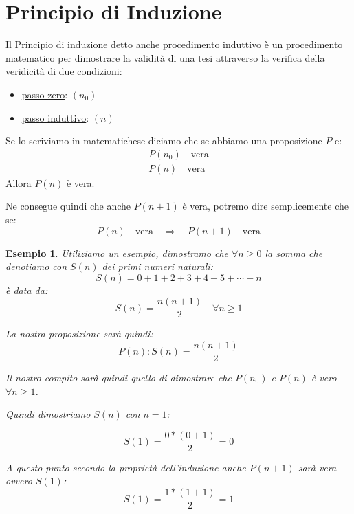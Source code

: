 \documentclass{article}
\newtheorem{exmp}{Esempio}[section]
\theoremstyle{definition}
\begin{document}
\newpage
\section{Principio di Induzione}\label{sec:principio_di_induzione}
Il \underline{Principio di induzione} detto anche procedimento induttivo è un procedimento matematico per dimostrare la validità di una tesi attraverso la verifica della veridicità di due condizioni:
\begin{itemize}
        \item \underline{passo zero}: $(n_0)$
        \item \underline{passo induttivo}: $(n)$
\end{itemize}
Se lo scriviamo in matematichese diciamo che se abbiamo una proposizione $P$ e:
\begin{align*}
        P(n_0) \quad \mbox{vera} \\
        P(n) \quad \mbox{vera}
\end{align*}
Allora $P(n)$ è vera. \par
Ne consegue quindi che anche $P(n+1)$ è vera, potremo dire semplicemente che se:
\begin{equation*}
        P(n) \quad \mbox{vera} \quad \Rightarrow \quad P(n+1) \quad \mbox{vera}
\end{equation*}

\begin{exmp}\label{es:esempio_induzione}
Utiliziamo un esempio, dimostramo che $\forall n \ge 0$ la somma che denotiamo con $S(n)$ dei primi numeri naturali:
\begin{equation*}
        S(n) = 0 + 1 + 2 + 3 + 4 + 5 + \cdots + n
\end{equation*}
è data da:
\begin{equation*}
        S(n) = \frac{n(n+1)}{2} \quad \forall n \ge 1
\end{equation*}

La nostra proposizione sarà quindi:
\begin{equation*}
        P(n) : S(n) = \frac{n(n+1)}{2}
\end{equation*}

Il nostro compito sarà quindi quello di dimostrare che $P(n_0)$ e $P(n)$ è vero $\forall n \ge 1$. \par
Quindi dimostriamo $S(n)$ con $n = 1$:
        
\begin{equation}\label{eq:esempio_induzione_1}
        S(1) = \frac{0*(0+1)}{2} = 0
\end{equation}

A questo punto secondo la proprietà dell'induzione anche $P(n+1)$ sarà vera ovvero $S(1)$:
\begin{equation}\label{eq:esempio_induzione_2}
        S(1) = \frac{1*(1+1)}{2} = 1
\end{equation}
\end{exmp}
\end{document}
